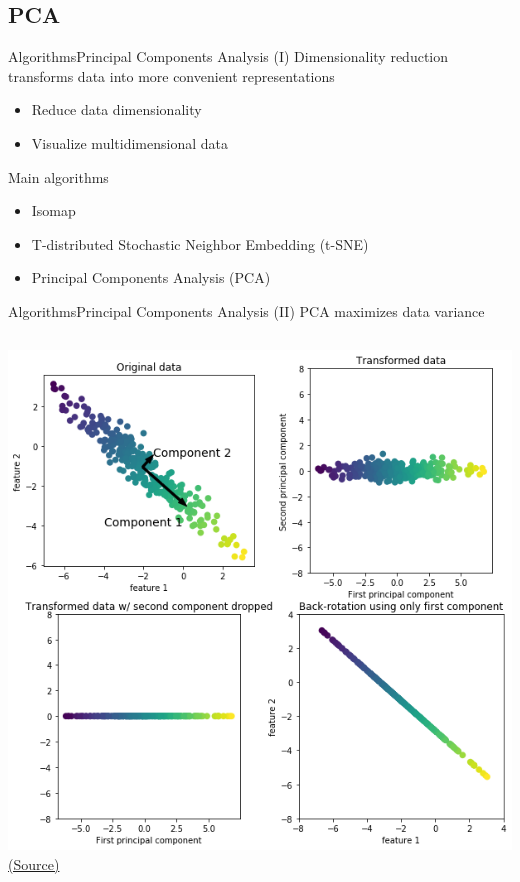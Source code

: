 \documentclass[10pt,compress]{beamer} %
\begin{document}
\subsection{PCA}

\begin{frame}{Algorithms}{Principal Components Analysis (I)}
	Dimensionality reduction transforms data into more convenient representations
	\begin{itemize}
		\item Reduce data dimensionality
		\item Visualize multidimensional data
	\end{itemize}

	Main algorithms
	\begin{itemize}
		\item Isomap
		\item T-distributed Stochastic Neighbor Embedding (t-SNE)
		\item Principal Components Analysis (PCA)
	\end{itemize}

\end{frame}

\begin{frame}{Algorithms}{Principal Components Analysis (II)}
	PCA maximizes data variance

    \begin{columns}
			\includegraphics[width=\linewidth]{figs/pca.png}
    		\centering \tiny{\href{https://github.com/amueller/introduction_to_ml_with_python/blob/master/03-unsupervised-learning.ipynb}{(Source)}}
    \end{columns}
\end{frame}
\end{document}
